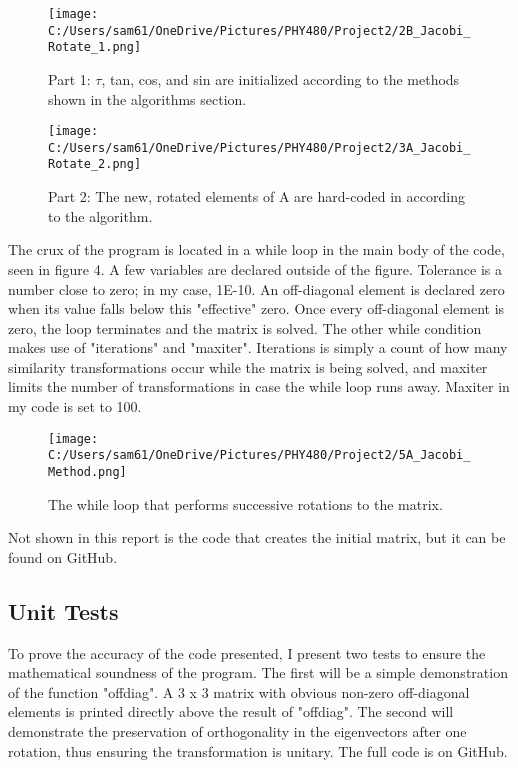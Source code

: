 \documentclass[10pt,showpacs,preprintnumbers,footinbib,amsmath,amssymb,aps,prl,twocolumn,groupedaddress,superscriptaddress,showkeys]{revtex4-1}
\begin{document}
\begin{figure}[!ht]
	\centering
	\texttt{[image: C:/Users/sam61/OneDrive/Pictures/PHY480/Project2/2B\_Jacobi\_Rotate\_1.png]}
	\label{uvx}
	\caption{Part 1: ${\tau}$, tan, cos, and sin are initialized according to the methods shown in the algorithms section.}
\end{figure}

\begin{figure}[!ht]
	\centering
	\texttt{[image: C:/Users/sam61/OneDrive/Pictures/PHY480/Project2/3A\_Jacobi\_Rotate\_2.png]}
	\label{uvx}
	\caption{Part 2: The new, rotated elements of A are hard-coded in according to the algorithm.}
\end{figure}

The crux of the program is located in a while loop in the main body of the code, seen in figure 4. A few variables are declared outside of the figure. Tolerance is a number close to zero; in my case, 1E-10. An off-diagonal element is declared zero when its value falls below this "effective" zero. Once every off-diagonal element is zero, the loop terminates and the matrix is solved. The other while condition makes use of "iterations" and "maxiter". Iterations is simply a count of how many similarity transformations occur while the matrix is being solved, and maxiter limits the number of transformations in case the while loop runs away. Maxiter in my code is set to 100.

\begin{figure}[!ht]
	\centering
	\texttt{[image: C:/Users/sam61/OneDrive/Pictures/PHY480/Project2/5A\_Jacobi\_Method.png]}
	\label{uvx}
	\caption{The while loop that performs successive rotations to the matrix.}
\end{figure}

Not shown in this report is the code that creates the initial matrix, but it can be found on GitHub.

	\subsection{Unit Tests}
To prove the accuracy of the code presented, I present two tests to ensure the mathematical soundness of the program. The first will be a simple demonstration of the function "offdiag". A 3 x 3 matrix with obvious non-zero off-diagonal elements is printed directly above the result of "offdiag". The second will demonstrate the preservation of orthogonality in the eigenvectors after one rotation, thus ensuring the transformation is unitary. The full code is on GitHub.
\end{document}
